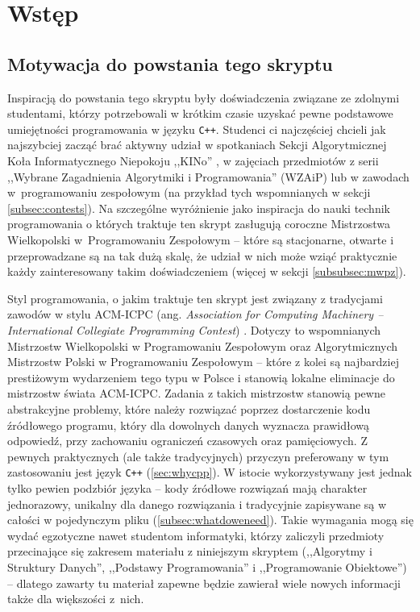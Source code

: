\chapter{Wstęp}

\section{Motywacja do powstania tego skryptu}

Inspiracją do powstania tego skryptu były doświadczenia związane ze zdolnymi
studentami, którzy potrzebowali w krótkim czasie uzyskać pewne podstawowe
umiejętności programowania w języku \texttt{C++}. Studenci ci najczęściej
chcieli jak najszybciej zacząć brać aktywny udział w spotkaniach Sekcji
Algorytmicznej Koła Informatycznego Niepokoju ,,KINo'' \cite{sekcja}, w zajęciach przedmiotów
z serii ,,Wybrane Zagadnienia Algorytmiki i Programowania'' (WZAiP) \cite{wzaip} lub w zawodach
w~programowaniu zespołowym (na przykład tych wspomnianych w sekcji \ref{subsec:contests}). Na szczególne wyróżnienie jako inspiracja do nauki
technik programowania o których traktuje ten skrypt zasługują coroczne
Mistrzostwa Wielkopolski w~Programowaniu Zespołowym -- które są stacjonarne,
otwarte i przeprowadzane są na tak dużą skalę, że udział w nich może wziąć
praktycznie każdy zainteresowany takim doświadczeniem (więcej w sekcji \ref{subsubsec:mwpz}).

Styl programowania, o jakim traktuje ten skrypt jest związany z tradycjami
zawodów w stylu ACM-ICPC (ang. \emph{Association for Computing Machinery --
International Collegiate Programming Contest}) \cite{acm-icpc}. Dotyczy to wspomnianych
Mistrzostw Wielkopolski w Programowaniu Zespołowym oraz Algorytmicznych
Mistrzostw Polski w Programowaniu Zespołowym -- które z kolei są najbardziej
prestiżowym wydarzeniem tego typu w Polsce i stanowią lokalne eliminacje
do mistrzostw świata ACM-ICPC. Zadania z takich mistrzostw stanowią pewne
abstrakcyjne problemy, które należy rozwiązać poprzez dostarczenie kodu
źródłowego programu, który dla dowolnych danych wyznacza prawidłową odpowiedź,
przy zachowaniu ograniczeń czasowych oraz pamięciowych. Z pewnych praktycznych
(ale także tradycyjnych) przyczyn preferowany w tym zastosowaniu jest język
\texttt{C++} (\ref{sec:whycpp}). W istocie wykorzystywany jest jednak tylko
pewien podzbiór języka -- kody źródłowe rozwiązań mają charakter jednorazowy,
unikalny dla danego rozwiązania i tradycyjnie zapisywane są w całości
w pojedynczym pliku (\ref{subsec:whatdoweneed}). Takie wymagania mogą się wydać
egzotyczne nawet studentom informatyki, którzy zaliczyli przedmioty przecinające
się zakresem materiału z niniejszym skryptem (,,Algorytmy i Struktury Danych'',
,,Podstawy Programowania'' i ,,Programowanie Obiektowe'') -- dlatego
zawarty tu materiał zapewne będzie zawierał wiele nowych informacji także dla
większości z~nich.

